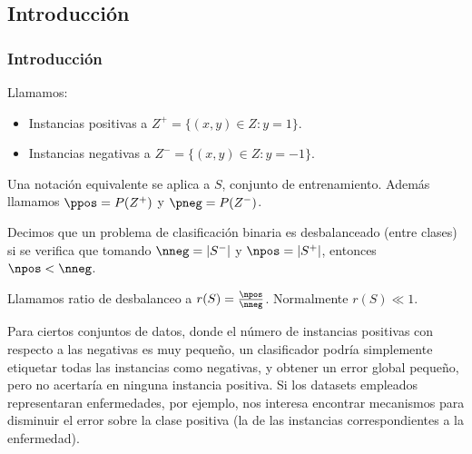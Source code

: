 \subsection{Introducción}
 \begin{frame}\frametitle{Introducción}
 \begin{definition}
 Llamamos:
 \begin{itemize}
  \item Instancias positivas a $Z^{+} = \{(x,y)\in Z: y=1\}$.
  \item Instancias negativas a $Z^{-} = \{(x,y)\in Z: y=-1\}$.
 \end{itemize}
 Una notación equivalente se aplica a $S$, conjunto de entrenamiento. Además llamamos $\ppos = P(Z^{+})$ y $\pneg = P(Z^{-})$.
 \end{definition}

 \begin{definition}
  Decimos que un problema de clasificación binaria es desbalanceado (entre clases) si se verifica que tomando 
  $\nneg = |S^{-}|$ y $\npos = |S^{+}|$, entonces $\npos < \nneg$.
  
  Llamamos ratio de desbalanceo a $r(S)=\frac{\npos}{\nneg}$. Normalmente $r(S) \ll 1$.
 \end{definition}

 Para ciertos conjuntos de datos, donde el número de instancias positivas con respecto a las negativas es muy pequeño, un clasificador podría simplemente
 etiquetar todas las instancias como negativas, y obtener un error global pequeño, pero no acertaría en ninguna instancia
 positiva. Si los datasets empleados representaran enfermedades, por ejemplo,
 nos interesa encontrar mecanismos para disminuir el error sobre la clase positiva (la de las instancias correspondientes
 a la enfermedad).
\end{frame}

